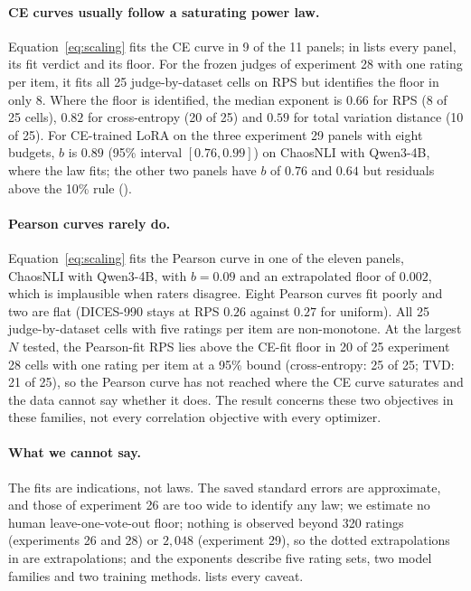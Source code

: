 \paragraph{CE curves usually follow a saturating power law.}
Equation~\eqref{eq:scaling} fits the CE curve in 9 of the 11 panels;  in  lists every panel, its fit verdict and its floor.
For the frozen judges of experiment 28 with one rating per item, it fits all 25 judge-by-dataset cells on RPS but identifies the floor in only 8.
Where the floor is identified, the median exponent is $0.66$ for RPS (8 of 25 cells), $0.82$ for cross-entropy (20 of 25) and $0.59$ for total variation distance (10 of 25).
For CE-trained LoRA on the three experiment 29 panels with eight budgets, $b$ is $0.89$ (95\% interval $[0.76,0.99]$) on ChaosNLI with Qwen3-4B, where the law fits; the other two panels have $b$ of $0.76$ and $0.64$ but residuals above the 10\% rule ().

\paragraph{Pearson curves rarely do.}
Equation~\eqref{eq:scaling} fits the Pearson curve in one of the eleven panels, ChaosNLI with Qwen3-4B, with $b=0.09$ and an extrapolated floor of $0.002$, which is implausible when raters disagree.
Eight Pearson curves fit poorly and two are flat (DICES-990 stays at RPS $0.26$ against $0.27$ for uniform).
All 25 judge-by-dataset cells with five ratings per item are non-monotone.
At the largest $N$ tested, the Pearson-fit RPS lies above the CE-fit floor in 20 of 25 experiment 28 cells with one rating per item at a 95\% bound (cross-entropy: 25 of 25; TVD: 21 of 25), so the Pearson curve has not reached where the CE curve saturates and the data cannot say whether it does.
The result concerns these two objectives in these families, not every correlation objective with every optimizer.

\paragraph{What we cannot say.}
The fits are indications, not laws.
The saved standard errors are approximate, and those of experiment 26 are too wide to identify any law; we estimate no human leave-one-vote-out floor; nothing is observed beyond 320 ratings (experiments 26 and 28) or $2{,}048$ (experiment 29), so the dotted extrapolations in  are extrapolations; and the exponents describe five rating sets, two model families and two training methods.
 lists every caveat.

